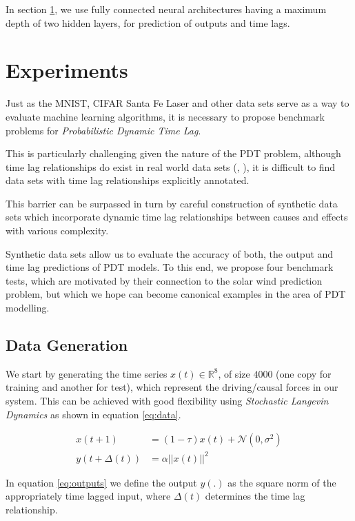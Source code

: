 \documentclass[envcountsect,runningheads]{llncs}
\theoremstyle{etoile}
\begin{document}
In section \ref{sec:exp}, we use fully connected neural architectures having a maximum depth of 
two hidden layers, for prediction of outputs and time lags.

\section{Experiments}\label{sec:exp}


Just as the MNIST, CIFAR Santa Fe Laser and other data sets serve as a way to evaluate machine learning 
algorithms, it is necessary to propose benchmark problems for \emph{Probabilistic Dynamic Time Lag}.

This is particularly challenging given the nature of the PDT problem, although time lag 
relationships do exist in real world data sets (\cite{doi:10.1002/jgra.50429}, \cite{ZHOU2006195}), 
it is difficult to find data sets with time lag relationships explicitly annotated.

This barrier can be surpassed in turn by careful construction of synthetic data sets which incorporate 
dynamic time lag relationships between causes and effects with various complexity.

Synthetic data sets allow us to evaluate the accuracy of both, the output and time lag predictions of 
PDT models. To this end, we propose four benchmark tests, which are motivated by their connection 
to the solar wind prediction problem, but which we hope can become canonical examples in the area 
of PDT modelling.

\subsection{Data Generation}

We start by generating the time series $x(t) \in \mathbb{R}^8$, of size $4000$ 
(one copy for training and another for test), which represent the driving/causal forces in our system. 
This can be achieved with good flexibility using \emph{Stochastic Langevin Dynamics} as shown in 
equation \ref{eq:data}.

\begin{align}
 x(t+1) &= (1 - \tau) x(t) + \mathcal{N}(0, \sigma^2) \label{eq:data}\\
 y(t+\Delta(t)) &= \alpha ||x(t)||^2 \label{eq:outputs}
\end{align}

In equation \ref{eq:outputs} we define the output $y(.)$ as the square norm of the appropriately 
time lagged input, where $\Delta(t)$ determines the time lag relationship.
\end{document}
